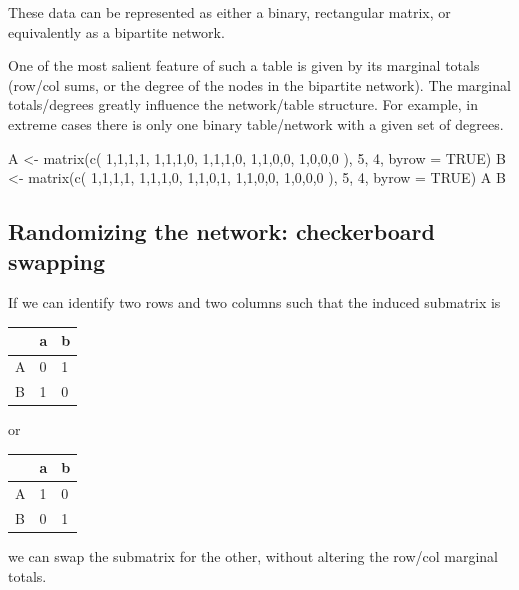 \documentclass[
  letterpaper,
  DIV=11,
  numbers=noendperiod]{scrreprt}
\newenvironment{Shaded}{\begin{snugshade}}{\end{snugshade}}
\newcommand{\NormalTok}[1]{\textcolor[rgb]{0.00,0.23,0.31}{#1}}
\begin{document}
These data can be represented as either a binary, rectangular matrix, or
equivalently as a bipartite network.

One of the most salient feature of such a table is given by its marginal
totals (row/col sums, or the degree of the nodes in the bipartite
network). The marginal totals/degrees greatly influence the
network/table structure. For example, in extreme cases there is only one
binary table/network with a given set of degrees.

\begin{Shaded}
\begin{Highlighting}[]
\NormalTok{A \textless{}{-} matrix(c(}
\NormalTok{  1,1,1,1,}
\NormalTok{  1,1,1,0,}
\NormalTok{  1,1,1,0,}
\NormalTok{  1,1,0,0,}
\NormalTok{  1,0,0,0}
\NormalTok{), 5, 4, byrow = TRUE)}
\NormalTok{B \textless{}{-} matrix(c(}
\NormalTok{  1,1,1,1,}
\NormalTok{  1,1,1,0,}
\NormalTok{  1,1,0,1,}
\NormalTok{  1,1,0,0,}
\NormalTok{  1,0,0,0}
\NormalTok{), 5, 4, byrow = TRUE)}
\NormalTok{A}
\NormalTok{B}
\end{Highlighting}
\end{Shaded}

\subsection{Randomizing the network: checkerboard
swapping}\label{randomizing-the-network-checkerboard-swapping}

If we can identify two rows and two columns such that the induced
submatrix is

\begin{longtable}[]{@{}lll@{}}
\toprule\noalign{}
& a & b \\
\midrule\noalign{}
\endhead
\bottomrule\noalign{}
\endlastfoot
A & 0 & 1 \\
B & 1 & 0 \\
\end{longtable}

or

\begin{longtable}[]{@{}lll@{}}
\toprule\noalign{}
& a & b \\
\midrule\noalign{}
\endhead
\bottomrule\noalign{}
\endlastfoot
A & 1 & 0 \\
B & 0 & 1 \\
\end{longtable}

we can swap the submatrix for the other, without altering the row/col
marginal totals.
\end{document}
